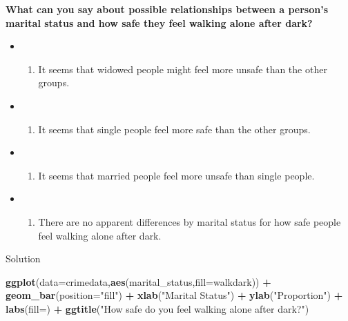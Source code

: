 \documentclass[
]{book}
\newenvironment{Shaded}{\begin{snugshade}}{\end{snugshade}}
\newcommand{\AttributeTok}[1]{\textcolor[rgb]{0.13,0.29,0.53}{#1}}
\newcommand{\FunctionTok}[1]{\textcolor[rgb]{0.13,0.29,0.53}{\textbf{#1}}}
\newcommand{\NormalTok}[1]{#1}
\newcommand{\SpecialCharTok}[1]{\textcolor[rgb]{0.81,0.36,0.00}{\textbf{#1}}}
\newcommand{\StringTok}[1]{\textcolor[rgb]{0.31,0.60,0.02}{#1}}
\providecommand{\tightlist}{%
  \setlength{\itemsep}{0pt}\setlength{\parskip}{0pt}}
\begin{document}
\textbf{What can you say about possible relationships between a person's marital status and how safe they feel walking alone after dark?}

\begin{itemize}
\item
  \begin{enumerate}
  \def\labelenumi{(\Alph{enumi})}
  \tightlist
  \item
    It seems that widowed people might feel more unsafe than the other groups.\\
  \end{enumerate}
\item
  \begin{enumerate}
  \def\labelenumi{(\Alph{enumi})}
  \setcounter{enumi}{1}
  \tightlist
  \item
    It seems that single people feel more safe than the other groups.\\
  \end{enumerate}
\item
  \begin{enumerate}
  \def\labelenumi{(\Alph{enumi})}
  \setcounter{enumi}{2}
  \tightlist
  \item
    It seems that married people feel more unsafe than single people.\\
  \end{enumerate}
\item
  \begin{enumerate}
  \def\labelenumi{(\Alph{enumi})}
  \setcounter{enumi}{3}
  \tightlist
  \item
    There are no apparent differences by marital status for how safe people feel walking alone after dark.
  \end{enumerate}
\end{itemize}

Solution

\begin{Shaded}
\begin{Highlighting}[]
\FunctionTok{ggplot}\NormalTok{(}\AttributeTok{data=}\NormalTok{crimedata,}\FunctionTok{aes}\NormalTok{(marital\_status,}\AttributeTok{fill=}\NormalTok{walkdark)) }\SpecialCharTok{+} \FunctionTok{geom\_bar}\NormalTok{(}\AttributeTok{position=}\StringTok{"fill"}\NormalTok{) }\SpecialCharTok{+}
  \FunctionTok{xlab}\NormalTok{(}\StringTok{"Marital Status"}\NormalTok{) }\SpecialCharTok{+} \FunctionTok{ylab}\NormalTok{(}\StringTok{"Proportion"}\NormalTok{) }\SpecialCharTok{+}
  \FunctionTok{labs}\NormalTok{(}\AttributeTok{fill=}\StringTok{\textquotesingle{}\textquotesingle{}}\NormalTok{) }\SpecialCharTok{+} \FunctionTok{ggtitle}\NormalTok{(}\StringTok{"How safe do you feel walking alone after dark?"}\NormalTok{)}
\end{Highlighting}
\end{Shaded}
\end{document}
